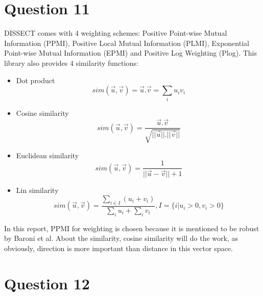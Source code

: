 \documentclass[12pt]{article}
\begin{document}
\section{Question 11}
DISSECT comes with 4 weighting schemes: Positive Point-wise Mutual Information (PPMI), Positive Local Mutual Information (PLMI), Exponential Point-wise Mutual Information (EPMI) and Positive Log Weighting (Plog).
This library also provides 4 similarity functions:
\begin{itemize}
	\item Dot product
		\[sim(\vec{u},\vec{v})=\vec{u}.\vec{v}=\sum_iu_iv_i\]
	\item Cosine similarity
		\[sim(\vec{u},\vec{v})=\frac{\vec{u}.\vec{v}}{\sqrt{||\vec{u}||.||\vec{v}||}}\]
	\item Euclidean similarity
		\[sim(\vec{u},\vec{v})=\frac{1}{||\vec{u}-\vec{v}||+1}\]
	\item Lin similarity
		\[sim(\vec{u},\vec{v})=\frac{\sum_{i\in I}(u_i+v_i)}{\sum_iu_i+\sum_iv_i}, I=\{i|u_i>0,v_i>0\}\]
\end{itemize}

In this report, PPMI for weighting is chosen because it is mentioned to be robust by Baroni et al. About the similarity, cosine similarity will do the work, as obviously, direction is more important than distance in this vector space.

\section{Question 12}
\end{document}
